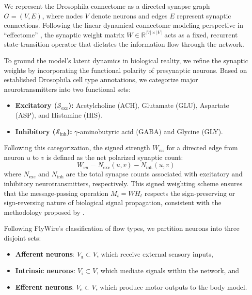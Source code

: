 \documentclass{article}
\theoremstyle{plain}
\theoremstyle{definition}
\theoremstyle{remark}
\begin{document}
We represent the Drosophila connectome as a directed synapse graph $G=(V,E)$, where nodes $V$ denote neurons and edges $E$ represent synaptic connections. Following the linear-dynamical connectome modeling perspective in ``effectome'' \citep{Pospisil2024}, the synaptic weight matrix $W \in \mathbb{R}^{|V| \times |V|}$ acts as a fixed, recurrent state-transition operator that dictates the information flow through the network.

To ground the model's latent dynamics in biological reality, we refine the synaptic weights by incorporating the functional polarity of presynaptic neurons. Based on established Drosophila cell type annotations, we categorize major neurotransmitters into two functional sets:
\vspace{-0.5em}
\begin{itemize}
    \setlength{\itemsep}{0pt}
    \item \textbf{Excitatory ($\mathcal{S}_{\text{exc}}$):} Acetylcholine (ACH), Glutamate (GLU), Aspartate (ASP), and Histamine (HIS).
    \item \textbf{Inhibitory ($\mathcal{S}_{\text{inh}}$):} $\gamma$-aminobutyric acid (GABA) and Glycine (GLY).
\end{itemize}
\vspace{-0.5em}

Following this categorization, the signed strength $W_{vu}$ for a directed edge from neuron $u$ to $v$ is defined as the net polarized synaptic count:
\begin{equation}
    W_{vu} = N_{\text{exc}}(u, v) - N_{\text{inh}}(u, v)
\end{equation}
where $N_{\text{exc}}$ and $N_{\text{inh}}$ are the total synapse counts associated with excitatory and inhibitory neurotransmitters, respectively. This signed weighting scheme ensures that the message-passing operation $M_t = W H_t$ respects the sign-preserving or sign-reversing nature of biological signal propagation, consistent with the methodology proposed by \citet{Pospisil2024}.

Following FlyWire’s classification of flow types, we partition neurons into three disjoint sets:
\vspace{-0.5em}
\begin{itemize}
\setlength{\itemsep}{0pt}
\setlength{\parsep}{0pt}
\setlength{\parskip}{0pt}
\item \textbf{Afferent neurons}: $V_a \subset V$, which receive external sensory inputs,
\item \textbf{Intrinsic neurons}: $V_i \subset V$, which mediate signals within the network, and
\item \textbf{Efferent neurons}: $V_e \subset V$, which produce motor outputs to the body model.
\end{itemize}
\vspace{-0.5em}
\end{document}
